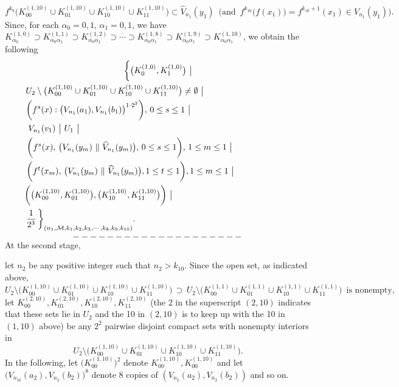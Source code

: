 \documentclass[12pt]{article}
\newcommand{\al}{\alpha}
\begin{document}
$$
f^{k_9}\big(K_{00}^{(1,10)} \cup K_{01}^{(1,10)} \cup K_{10}^{(1,10)} \cup K_{11}^{(1,10)}\big) \subset \widehat V_{n_1}(y_1) \,\,\, \bigg(\text{and} \,\,\, f^{k_{10}}\big(f(x_1)\big) = f^{k_{10}+1}(x_1) \in V_{n_1}(y_1)\bigg).
$$
\indent Since, for each $\al_0 = 0,1$, $\al_1 = 0, 1$, we have $K_{\al_0}^{(1,0)} \supset K_{\al_0\al_1}^{(1,1)} \supset K_{\al_0\al_1}^{(1,2)} \supset \cdots \supset K_{\al_0\al_1}^{(1,8)} \supset K_{\al_0\al_1}^{(1,9)} \supset K_{\al_0\al_1}^{(1,10)}$, we obtain the following 
\begin{multline*}
$$
\bigg\{ \big(K_0^{(1,0)}, K_1^{(1,0)}\big) \,\, \big| \\
\,\,\, U_2 \setminus \big(K_{00}^{(1,10)} \cup K_{01}^{(1,10)} \cup K_{10}^{(1,10)} \cup K_{11}^{(1,10)} \big) \ne \emptyset \,\, \big| \qquad\qquad\qquad\qquad\qquad\,\,\,\, \\ 
\,\, \bigg(f^s(x):\big(V_{n_1}(a_1), V_{n_1}(b_1)\big)^{1 \cdot 2^2}\bigg), \, 0 \le s \le 1 \,\, \big| \qquad\qquad\qquad\qquad\qquad\qquad \\
\, V_{n_1}(v_1) \,\, \big| \,\, U_1 \,\, \big|  \qquad\qquad\qquad\qquad\qquad\qquad\qquad\qquad\qquad\qquad\qquad\quad\quad\,\,\,\, \\
\bigg(f^{s}(x), \, \big(V_{n_1}(y_m) \,\, \| \,\, \widehat V_{n_1}(y_m)\big), \, 0 \le s \le 1\bigg), \, 1 \le m \le 1 \,\, \big| \qquad\qquad\quad\quad\,\,\,\, \\ 
\qquad \bigg(f^t(x_m), \, \big(V_{n_1}(y_m) \,\, \| \,\, \widehat V_{n_1}(y_m)\big), 1 \le t \le 1\bigg), 1 \le m \le 1 \,\, \big| \qquad\qquad\qquad\qquad\,\,\, \\ 
\bigg(\big(K_{00}^{(1,10)}, K_{01}^{(1,10)}\big), \big(K_{10}^{(1,10)}, K_{11}^{(1,10)}\big)\bigg) \,\, \big| \qquad\qquad\qquad\qquad\qquad\qquad\quad\quad \\
\,\, \frac 1{2^3}  \, \bigg\}_{(n_1, \mathcal M, k_1, k_2, k_3, \cdots, k_8, k_9, k_{10})}. \qquad\qquad\qquad\qquad\qquad\qquad\qquad\qquad\qquad\,\,\,
$$
\end{multline*}
$$--------------------$$
\indent At the second stage, 

let $n_2$ be any positive integer such that $n_2 > k_{10}$.  Since the open set, as indicated above,
$$
U_2 \setminus \big(K_{00}^{(1,10)} \cup K_{01}^{(1,10)} \cup K_{10}^{(1,10)} \cup K_{11}^{(1,10)}\big) \, \supset \, U_2 \setminus \big(K_{00}^{(1,1)} \cup K_{01}^{(1,1)} \cup K_{10}^{(1,1)} \cup K_{11}^{(1,1)}\big)\,\,\, \text{is nonempty},
$$
let $K_{00}^{(2,10)}, K_{01}^{(2,10)}, K_{10}^{(2,10)}, K_{11}^{(2,10)}$ \big(the 2 in the superscript $(2, 10)$ indicates that these sets lie in $U_2$ and the 10 in $(2, 10)$ is to keep up with the 10 in $(1, 10)$ above\big) be any $2^2$ pairwise disjoint compact sets with nonempty interiors in 
$$
U_2 \setminus \big( K_{00}^{(1,10)} \cup K_{01}^{(1,10)} \cup K_{10}^{(1,10)} \cup K_{11}^{(1,10)}\big).
$$
\indent In the following, let $\big(K_{00}^{(1,10)}\big)^2$ denote $K_{00}^{(1,10)}, K_{00}^{(1,10)}$ and let $\big(V_{n_10}(a_2), V_{n_2}(b_2)\big)^8$ denote 8 copies of $(V_{n_2}(a_2), V_{n_2}(b_2))$ and so on.  
\end{document}
